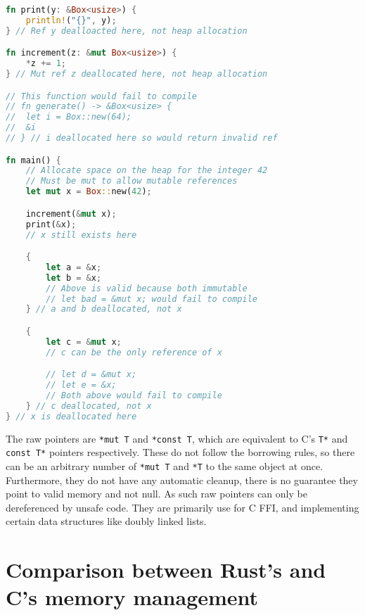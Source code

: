 \documentclass[10pt,a4paper,twocolumn]{article}
\begin{document}
\begin{lstlisting}[language=Rust, float=h, label=lst:refLife, caption={A short example of the
	lifetime of references and how only immutable references or a mutable reference can exist
	at once}]
fn print(y: &Box<usize>) {
	println!("{}", y);
} // Ref y dealloacted here, not heap allocation

fn increment(z: &mut Box<usize>) {
	*z += 1;
} // Mut ref z deallocated here, not heap allocation

// This function would fail to compile
// fn generate() -> &Box<usize> {
//	let i = Box::new(64);
//	&i
// } // i deallocated here so would return invalid ref

fn main() {
	// Allocate space on the heap for the integer 42
	// Must be mut to allow mutable references
	let mut x = Box::new(42);

	increment(&mut x);
	print(&x);
	// x still exists here

	{
		let a = &x;
		let b = &x;
		// Above is valid because both immutable
		// let bad = &mut x; would fail to compile
	} // a and b deallocated, not x

	{
		let c = &mut x;
		// c can be the only reference of x

		// let d = &mut x;
		// let e = &x;
		// Both above would fail to compile
	} // c deallocated, not x
} // x is deallocated here
\end{lstlisting}

The raw pointers are \lstinline{*mut T} and \lstinline{*const T}, which are equivalent to C's
\lstinline{T*} and \lstinline{const T*} pointers respectively.
These do not follow the borrowing rules, so there can be an arbitrary number of \lstinline{*mut T}
and \lstinline{*T} to the same object at once.
Furthermore, they do not have any automatic cleanup, there is no guarantee they point to valid
memory and not null.
As such raw pointers can only be dereferenced by unsafe code.
They are primarily use for C FFI, and implementing certain data structures like doubly linked lists.

\section{Comparison between Rust's and C's memory management}
\label{cComp}
\end{document}
